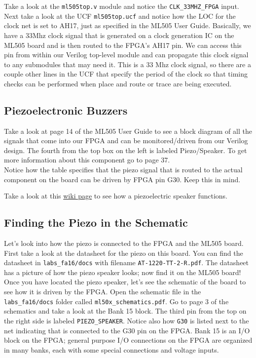 \documentclass[11pt]{article}
\begin{document}
Take a look at the \verb|ml505top.v| module and notice the \verb|CLK_33MHZ_FPGA| input. Next take a look at the UCF \verb|ml505top.ucf| and notice how the LOC for the clock net is set to AH17, just as specified in the ML505 User Guide. Basically, we have a 33Mhz clock signal that is generated on a clock generation IC on the ML505 board and is then routed to the FPGA's AH17 pin. We can access this pin from within our Verilog top-level module and can propagate this clock signal to any submodules that may need it. This is a 33 Mhz clock signal, so there are a couple other lines in the UCF that specify the period of the clock so that timing checks can be performed when place and route or trace are being executed.

\subsection{Piezoelectronic Buzzers}
Take a look at page 14 of the ML505 User Guide to see a block diagram of all the signals that come into our FPGA and can be monitored/driven from our Verilog design. The fourth from the top box on the left is labeled Piezo/Speaker. To get more information about this component go to page 37.\\

Notice how the table specifies that the piezo signal that is routed to the actual component on the board can be driven by FPGA pin G30. Keep this in mind.

Take a look at this \href{https://en.wikipedia.org/wiki/Piezoelectric_speaker}{wiki page} to see how a piezoelectric speaker functions.

\subsection{Finding the Piezo in the Schematic}
Let's look into how the piezo is connected to the FPGA and the ML505 board. First take a look at the datasheet for the piezo on this board. You can find the datasheet in \verb|labs_fa16/docs| with filename \verb|AT-1220-TT-2-R.pdf|. The datasheet has a picture of how the piezo speaker looks; now find it on the ML505 board! \\

Once you have located the piezo speaker, let's see the schematic of the board to see how it is driven by the FPGA. Open the schematic file in the \verb|labs_fa16/docs| folder called \verb|ml50x_schematics.pdf|. Go to page 3 of the schematics and take a look at the Bank 15 block. The third pin from the top on the right side is labeled \verb|PIEZO_SPEAKER|. Notice also how \verb|G30| is listed next to the net indicating that is connected to the G30 pin on the FPGA. Bank 15 is an I/O block on the FPGA; general purpose I/O connections on the FPGA are organized in many banks, each with some special connections and voltage inputs.
\end{document}
